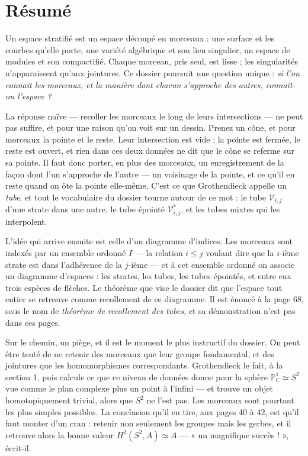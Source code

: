 \documentclass[11pt,a4paper]{article}
\begin{document}
\section*{Résumé}

\begin{resume}
Un espace stratifié est un espace découpé en morceaux : une surface et les
courbes qu'elle porte, une variété algébrique et son lieu singulier, un espace
de modules et son compactifié. Chaque morceau, pris seul, est lisse ; les
singularités n'apparaissent qu'aux jointures. Ce dossier poursuit une question
unique : \emph{si l'on connaît les morceaux, et la manière dont chacun
s'approche des autres, connaît-on l'espace ?}

La réponse naïve — recoller les morceaux le long de leurs intersections — ne
peut pas suffire, et pour une raison qu'on voit sur un dessin. Prenez un cône,
et pour morceaux la pointe et le reste. Leur intersection est vide : la pointe
est fermée, le reste est ouvert, et rien dans ces deux données ne dit que le
cône se referme sur sa pointe. Il faut donc porter, en plus des morceaux, un
enregistrement de la façon dont l'un s'approche de l'autre — un voisinage de la
pointe, et ce qu'il en reste quand on ôte la pointe elle-même. C'est ce que
Grothendieck appelle un \emph{tube}, et tout le vocabulaire du dossier tourne
autour de ce mot : le tube $\mathcal{V}_{i,j}$ d'une strate dans une autre, le
tube épointé $\mathcal{V}^{*}_{i,j}$, et les tubes mixtes qui les interpolent.

L'idée qui arrive ensuite est celle d'un diagramme d'indices. Les morceaux sont
indexés par un ensemble ordonné $I$ — la relation $i \leq j$ voulant dire que la
$i$-ième strate est dans l'adhérence de la $j$-ième — et à cet ensemble ordonné
on associe un diagramme d'espaces : les strates, les tubes, les tubes épointés,
et entre eux trois espèces de flèches. Le théorème que vise le dossier dit que
l'espace tout entier se retrouve comme recollement de ce diagramme. Il est
énoncé à la page 68, sous le nom de \emph{théorème de recollement des tubes}, et
sa démonstration n'est pas dans ces pages.

Sur le chemin, un piège, et il est le moment le plus instructif du dossier. On
peut être tenté de ne retenir des morceaux que leur groupe fondamental, et des
jointures que les homomorphismes correspondants. Grothendieck le fait, à la
section 1, puis calcule ce que ce niveau de données donne pour la sphère
$\mathbb{P}^{1}_{\mathbb{C}} \simeq S^{2}$ vue comme le plan complexe plus un
point à l'infini — et trouve un objet homotopiquement trivial, alors que $S^{2}$
ne l'est pas. Les morceaux sont pourtant les plus simples possibles. La
conclusion qu'il en tire, aux pages 40 à 42, est qu'il faut monter d'un cran :
retenir non seulement les groupes mais les gerbes, et il retrouve alors la bonne
valeur $H^{2}(S^{2},A) \simeq A$ — « un magnifique succès ! », écrit-il.


\end{resume}
\end{document}
